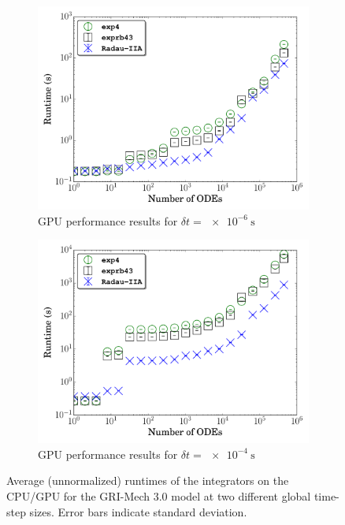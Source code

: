 \documentclass[preprint]{elsarticle}
\begin{document}
\begin{figure}[htb]
\begin{subfigure}{0.49\textwidth}
      \includegraphics[width=\linewidth]{CH4_1e-06_gpu_nonorm.pdf}
      \caption{GPU performance results for $\delta t = \SI{e-6}{\second}$}
  \end{subfigure}
  \begin{subfigure}{0.49\textwidth}
      \includegraphics[width=\linewidth]{CH4_1e-04_gpu_nonorm.pdf}
      \caption{GPU performance results for $\delta t = \SI{e-4}{\second}$}
  \end{subfigure}
  \caption{Average (unnormalized) runtimes of the integrators on the CPU\slash GPU for the GRI-Mech 3.0 model at two different global time-step sizes.
  Error bars indicate standard deviation.}
  \label{F:raw_perf_CH4}
\end{figure}

\clearpage



\end{document}
